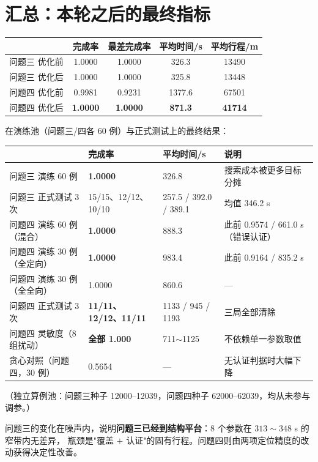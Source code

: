 \section{汇总：本轮之后的最终指标}

\begin{center}
\begin{tabular}{lcccc}
\toprule
& 完成率 & 最差完成率 & 平均时间/s & 平均行程/m \\ \midrule
问题三 优化前 & 1.0000 & 1.0000 & 326.3 & 13490 \\
问题三 优化后 & 1.0000 & 1.0000 & 325.8 & 13448 \\
问题四 优化前 & 0.9981 & 0.9231 & 1377.6 & 67501 \\
问题四 优化后 & \textbf{1.0000} & \textbf{1.0000} & \textbf{871.3} & \textbf{41714} \\
\bottomrule
\end{tabular}
\end{center}

在演练池（问题三/四各 60 例）与正式测试上的最终结果：

\begin{center}
\small
\footnotesize
\begin{tabular}{p{4.3cm}p{3.0cm}p{2.8cm}p{4.3cm}}
\toprule
 & 完成率 & 平均时间/s & 说明 \\ \midrule
问题三 演练 60 例 & \textbf{1.0000} & 326.8 & 搜索成本被更多目标分摊 \\
问题三 正式测试 3 次 & 15/15、12/12、10/10 & 257.5 / 392.0 / 389.1 & 均值 346.2 s \\
问题四 演练 60 例（混合） & \textbf{1.0000} & 888.3 & 此前 0.9574 / 661.0 s（错误认证） \\
问题四 演练 30 例（全定向） & \textbf{1.0000} & 983.4 & 此前 0.9164 / 835.2 s \\
问题四 演练 30 例（全全向） & 1.0000 & 860.6 & --- \\
问题四 正式测试 3 次 & \textbf{11/11、12/12、11/11} & 1133 / 945 / 1193 & 三局全部清除 \\
问题四 灵敏度（8 组扰动） & \textbf{全部 1.000} & 711$\sim$1125 & 不依赖单一参数取值 \\
贪心对照（问题四，30 例） & 0.5654 & --- & 无认证判据时大幅下降 \\
\bottomrule
\end{tabular}
\end{center}

（独立算例池：问题三种子 12000--12039，问题四种子 62000--62039，均从未参与调参。）

问题三的变化在噪声内，说明\textbf{问题三已经到结构平台}：8 个参数在 $313\sim348$ s 的窄带内无差异，
瓶颈是"覆盖 $+$ 认证"的固有行程。问题四则由两项定位精度的改动获得决定性改善。



